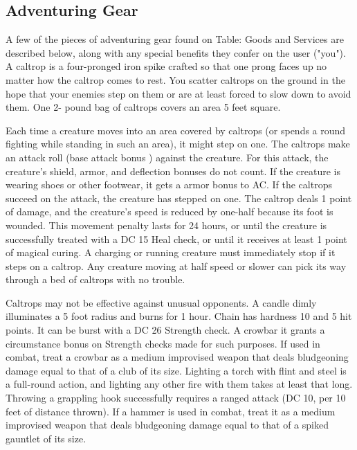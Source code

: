 \subsection{Adventuring Gear}
A few of the pieces of adventuring gear found on Table: Goods and Services are described below, along with any special benefits they confer on the user ("you").
 A caltrop is a four-pronged iron spike crafted so that one prong faces up no matter how the caltrop comes to rest. You scatter caltrops on the ground in the hope that your enemies step on them or are at least forced to slow down to avoid them. One 2- pound bag of caltrops covers an area 5 feet square.
\par Each time a creature moves into an area covered by caltrops (or spends a round fighting while standing in such an area), it might step on one. The caltrops make an attack roll (base attack bonus ) against the creature. For this attack, the creature's shield, armor, and deflection bonuses do not count. If the creature is wearing shoes or other footwear, it gets a  armor bonus to AC. If the caltrops succeed on the attack, the creature has stepped on one. The caltrop deals 1 point of damage, and the creature's speed is reduced by one-half because its foot is wounded. This movement penalty lasts for 24 hours, or until the creature is successfully treated with a DC 15 Heal check, or until it receives at least 1 point of magical curing. A charging or running creature must immediately stop if it steps on a caltrop. Any creature moving at half speed or slower can pick its way through a bed of caltrops with no trouble.
\par Caltrops may not be effective against unusual opponents.
 A candle dimly illuminates a 5 foot radius and burns for 1 hour.
 Chain has hardness 10 and 5 hit points. It can be burst with a DC 26 Strength check.
 A crowbar it grants a  circumstance bonus on Strength checks made for such purposes. If used in combat, treat a crowbar as a medium improvised weapon that deals bludgeoning damage equal to that of a club of its size.
 Lighting a torch with flint and steel is a full-round action, and lighting any other fire with them takes at least that long.
 Throwing a grappling hook successfully requires a ranged attack (DC 10,  per 10 feet of distance thrown).
 If a hammer is used in combat, treat it as a medium improvised weapon that deals bludgeoning damage equal to that of a spiked gauntlet of its size.
